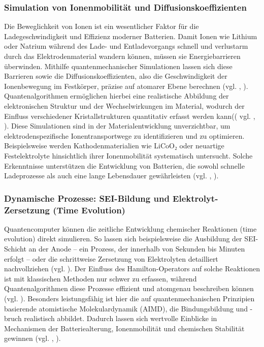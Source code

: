 \subsubsection{Simulation von Ionenmobilität und Diffusionskoeffizienten}
Die Beweglichkeit von Ionen ist ein wesentlicher Faktor für die Ladegeschwindigkeit und Effizienz moderner Batterien. Damit Ionen wie Lithium oder Natrium während des Lade- und Entladevorgangs schnell und verlustarm durch das Elektrodenmaterial wandern können, müssen sie Energiebarrieren überwinden. Mithilfe quantenmechanischer Simulationen lassen sich diese Barrieren sowie die Diffusionskoeffizienten, also die Geschwindigkeit der Ionenbewegung im Festkörper, präzise auf atomarer Ebene berechnen (vgl. \cite{hanaor_computational_2024}, \cite{urban_computational_2016}). Quantenalgorithmen ermöglichen hierbei eine realistische Abbildung der elektronischen Struktur und der Wechselwirkungen im Material, wodurch der Einfluss verschiedener Kristallstrukturen quantitativ erfasst werden kann(( vgl. \cite{aspuru-guzik_simulated_2005}, \cite{baker_simulating_2024}).
Diese Simulationen sind in der Materialentwicklung unverzichtbar, um elektrodenspezifische Ionentransportwege zu identifizieren und zu optimieren. Beispielsweise werden Kathodenmaterialien wie LiCoO₂ oder neuartige Festelektrolyte hinsichtlich ihrer Ionenmobilität systematisch untersucht. Solche Erkenntnisse unterstützen die Entwicklung von Batterien, die sowohl schnelle Ladeprozesse als auch eine lange Lebensdauer gewährleisten (vgl. \cite{hanaor_computational_2024}, \cite{urban_computational_2016}).

\subsubsection{Dynamische Prozesse: SEI-Bildung und Elektrolyt-Zersetzung (Time Evolution)}
Quantencomputer können die zeitliche Entwicklung chemischer Reaktionen (time evolution) direkt simulieren. So lassen sich beispielsweise die Ausbildung der SEI-Schicht an der Anode – ein Prozess, der innerhalb von Sekunden bis Minuten erfolgt – oder die schrittweise Zersetzung von Elektrolyten detailliert nachvollziehen (vgl. \cite{hanaor_computational_2024}). Der Einfluss des Hamilton-Operators auf solche Reaktionen ist mit klassischen Methoden nur schwer zu erfassen, während Quantenalgorithmen diese Prozesse effizient und atomgenau beschreiben können (vgl. \cite{weidman_quantum_2024}). Besonders leistungsfähig ist hier die auf quantenmechanischen Prinzipien basierende atomistische Molekulardynamik (AIMD), die Bindungsbildung und -bruch realistisch abbildet. Dadurch lassen sich wertvolle Einblicke in Mechanismen der Batteriealterung, Ionenmobilität und chemischen Stabilität gewinnen (vgl. \cite{hanaor_computational_2024}, \cite{weidman_quantum_2024}).

